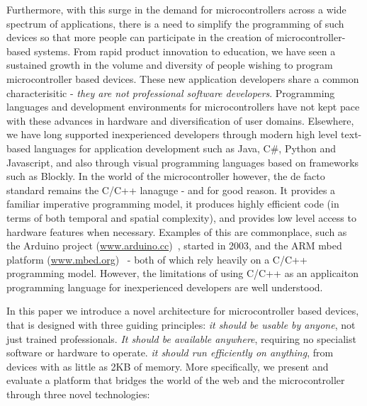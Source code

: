 Furthermore, with this surge in the demand for microcontrollers across a wide spectrum of applications, 
there is a need to simplify the programming of such devices so that more people can participate in 
the creation of microcontroller-based systems. From rapid product innovation to education,
we have seen a sustained growth in the volume and diversity of people wishing to program microcontroller based devices. 
These new application developers share a common characterisitic - \emph{they are not professional software developers}. 
Programming languages and development environments for microcontrollers have not kept pace with these advances 
in hardware and diversification of user domains. Elsewhere, we have long supported inexperienced developers through  
modern high level text-based languages for application development such as Java, C\#, Python and Javascript, and also 
through visual programming languages based on frameworks such as Blockly. In the world of the microcontroller however, the de facto standard remains the C/C++ lanaguge - and for good reason. 
It provides a familiar imperative programming model, it produces highly efficient code (in terms of both 
temporal and spatial complexity), and provides low level access to hardware features when necessary. Examples
of this are commonplace, such as the Arduino project (\url{www.arduino.cc})~\cite{buildingArduino2014},
started in 2003, and the ARM mbed platform (\url{www.mbed.org})~\cite{mbed} - both of which rely heavily on
a C/C++ programming model. However, the limitations of using C/C++ as an applicaiton programming language for 
inexperienced developers are well understood. 

In this paper we introduce a novel architecture for microcontroller based devices,
that is designed with three guiding principles: 
\emph{it should be usable by anyone}, not just trained professionals. 
\emph{It should be available anywhere}, requiring no specialist software or hardware to operate.
\emph{it should run efficiently on anything}, from devices with as little as 2KB of memory.
More specifically, we present and evaluate a platform that bridges the world of the web and the microcontroller through 
three novel technologies:

